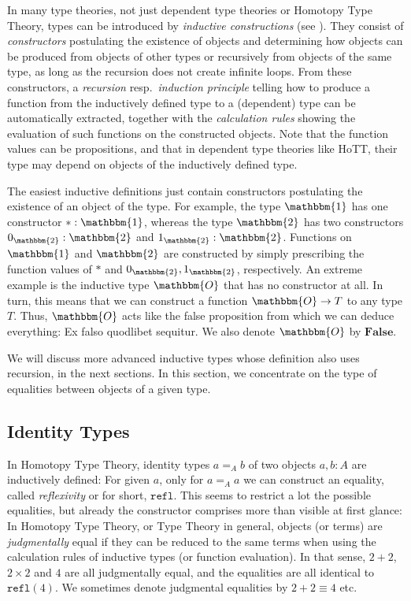 \documentclass{amsart}
\theoremstyle{plain}
\numberwithin{equation}{section} %
\numberwithin{figure}{section} %
\theoremstyle{plain}
\theoremstyle{plain}
\theoremstyle{plain}
\theoremstyle{plain}
\theoremstyle{plain}
\theoremstyle{plain}
\theoremstyle{remark}
\theoremstyle{remark}
\theoremstyle{remark}
\begin{document}
In many type theories, not just dependent type theories or Homotopy Type Theory, types can be introduced by \textit{inductive constructions} (see \cite[5.1]{HoTTBook}). They consist of \textit{constructors} postulating the existence of objects and determining how objects can be produced from objects of other types or recursively from objects of the same type, as long as the recursion does not create infinite loops. From these constructors, a \textit{recursion} resp.\ \textit{induction principle} telling how to produce a function from the inductively defined type to a (dependent) type can be automatically extracted, together with the \textit{calculation rules} showing the evaluation of such functions on the constructed objects. Note that the function values can be propositions, and that in dependent type theories like HoTT, their type may depend on objects of the inductively defined type.

The easiest inductive definitions just contain constructors postulating the existence of an object of the type. For example, the type $\mathbbm{1}$ has one constructor $\ast: \mathbbm{1}$, whereas the type $\mathbbm{2}$ has two constructors $0_\mathbbm{2} : \mathbbm{2}$ and $1_\mathbbm{2} : \mathbbm{2}$. Functions on $\mathbbm{1}$ and $\mathbbm{2}$ are constructed by simply prescribing the function values of $\ast$ and $0_\mathbbm{2}, 1_\mathbbm{2}$, respectively. An extreme example is the inductive type $\mathbbm{O}$ that has no constructor at all. In turn, this means that we can construct a function $\mathbbm{O} \rightarrow T$ to any type $T$. Thus, $\mathbbm{O}$ acts like the false proposition from which we can deduce everything: Ex falso quodlibet sequitur. We also denote $\mathbbm{O}$ by $\mathbf{False}$.


We will discuss more advanced inductive types whose definition also uses recursion, in the next sections. In this section, we concentrate on the type of equalities between objects of a given type.


\subsection{Identity Types}

In Homotopy Type Theory, identity types $a =_A b$ of two objects $a, b : A$ are inductively defined: For given $a$, only for $a =_A a$ we can construct an equality, called \textit{reflexivity} or for short, $\mathtt{refl}$. This seems to restrict a lot the possible equalities, but already the constructor comprises more than visible at first glance: In Homotopy Type Theory, or  Type Theory in general, objects (or terms) are \textit{judgmentally} equal if they can be reduced to the same terms when using the calculation rules of inductive types (or function evaluation). In that sense, $2 + 2$, $2 \times 2$ and $4$ are all judgmentally equal, and the equalities are all identical to $\mathtt{refl}(4)$. We sometimes denote judgmental equalities by $2 + 2 \equiv 4$ etc. 
\end{document}
